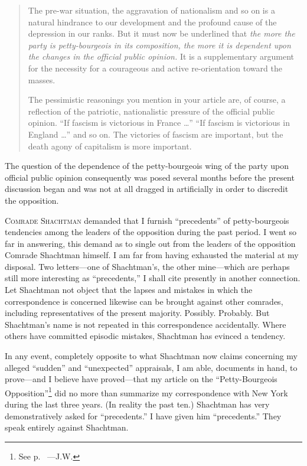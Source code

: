 \begin{quote}
  The pre-war situation, the aggravation of nationalism and so on is a natural hindrance to our development and the profound cause of the depression in our ranks. But it must now be underlined that \emph{the more the party is petty-bourgeois in its composition, the more it is dependent upon the changes in the official public opinion.} It is a supplementary argument for the necessity for a courageous and active re-orientation toward the masses.

  The pessimistic reasonings you mention in your article are, of course, a reflection of the patriotic, nationalistic pressure of the official public opinion. ``If fascism is victorious in France \dots'' ``If fascism is victorious in England \dots'' and so on. The victories of fascism are important, but the death agony of capitalism is more important.
\end{quote}

The question of the dependence of the petty-bourgeois wing of the party upon official public opinion consequently was posed several months before the present discussion began and was not at all dragged in artificially in order to discredit the opposition.

\triast

\noindent
\textsc{Comrade Shachtman} demanded that I furnish “precedents” of petty-bourgeois tendencies among the leaders of the opposition during the past period. I went so far in answering, this demand as to single out from the leaders of the opposition Comrade Shachtman himself. I am far from having exhausted the material at my disposal. Two letters---one of Shachtman’s, the other mine---which are perhaps still more interesting as “precedents,” I shall cite presently in another connection. Let Shachtman not object that the lapses and mistakes in which the correspondence is concerned likewise can be brought against other comrades, including representatives of the present majority. Possibly. Probably. But Shachtman’s name is not repeated in this correspondence accidentally. Where others have committed episodic mistakes, Shachtman has evinced a tendency.

In any event, completely opposite to what Shachtman now claims concerning my alleged “sudden” and “unexpected” appraisals, I am able, documents in hand, to prove---and I believe have proved---that my article on the ``Petty-Bourgeois Opposition''\footnote{See p.~\pageref{1939-12-15_a-petty-bourgeois-opposition-in-the-socialist-workers-party} ---J.W.} did no more than summarize my correspondence with New York during the last three years. (In reality the past ten.) Shachtman has very demonstratively asked for “precedents.” I have given him “precedents.” They speak entirely against Shachtman.


